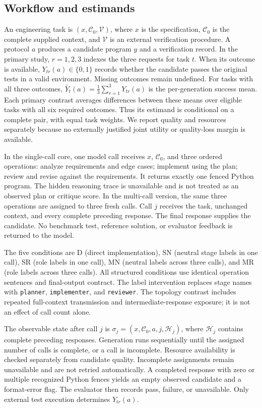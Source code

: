\documentclass[pdflatex,sn-nature]{scientificreports}
\begin{document}
\subsection{Workflow and estimands}
An engineering task is $(x,\mathcal{C}_0,\mathcal{V})$, where $x$ is the specification, $\mathcal{C}_0$ is the complete supplied context, and $\mathcal{V}$ is an external verification procedure. A protocol $a$ produces a candidate program $y$ and a verification record. In the primary study, $r=1,2,3$ indexes the three requests for task $t$. When its outcome is available, $Y_{tr}(a)\in\{0,1\}$ records whether the candidate passes the original tests in a valid environment. Missing outcomes remain undefined. For tasks with all three outcomes, $\bar Y_t(a)=\frac{1}{3}\sum_{r=1}^{3}Y_{tr}(a)$ is the per-generation success mean. Each primary contrast averages differences between these means over eligible tasks with all six required outcomes. Thus its estimand is conditional on a complete pair, with equal task weights. We report quality and resources separately because no externally justified joint utility or quality-loss margin is available.

In the single-call core, one model call receives $x$, $\mathcal{C}_0$, and three ordered operations: analyze requirements and edge cases; implement using the plan; review and revise against the requirements. It returns exactly one fenced Python program. The hidden reasoning trace is unavailable and is not treated as an observed plan or critique score. In the multi-call version, the same three operations are assigned to three fresh calls. Call $j$ receives the task, unchanged context, and every complete preceding response. The final response supplies the candidate. No benchmark test, reference solution, or evaluator feedback is returned to the model.

The five conditions are D (direct implementation), SN (neutral stage labels in one call), SR (role labels in one call), MN (neutral labels across three calls), and MR (role labels across three calls). All structured conditions use identical operation sentences and final-output contract. The label intervention replaces stage names with \texttt{planner}, \texttt{implementer}, and \texttt{reviewer}. The topology contrast includes repeated full-context transmission and intermediate-response exposure; it is not an effect of call count alone.

The observable state after call $j$ is $\sigma_j=(x,\mathcal{C}_0,a,j,\mathcal{H}_j)$, where $\mathcal{H}_j$ contains complete preceding responses. Generation runs sequentially until the assigned number of calls is complete, or a call is incomplete. Resource availability is checked separately from candidate quality. Incomplete assignments remain unavailable and are not retried automatically. A completed response with zero or multiple recognized Python fences yields an empty observed candidate and a format-error flag. The evaluator then records pass, failure, or unavailable. Only external test execution determines $Y_{tr}(a)$.
\end{document}
